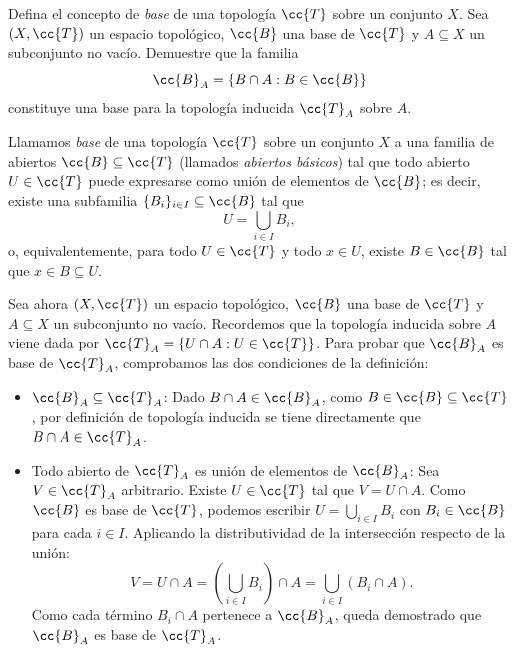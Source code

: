 \documentclass[12pt]{article}
\begin{document}
    \newpage
    \setcounter{ejercicio}{0} %
    \noindent
\begin{ejercicio}
Defina el concepto de \emph{base} de una topología $\cc{T}$ sobre un conjunto $X$.
Sea $(X, \cc{T})$ un espacio topológico, $\cc{B}$ una base de $\cc{T}$ y $A \subseteq X$ un subconjunto no vacío. Demuestre que la familia
\[
    \cc{B}_A = \{ B \cap A : B \in \cc{B} \}
\]
constituye una base para la topología inducida $\cc{T}_A$ sobre $A$.

\medskip
Llamamos \emph{base} de una topología $\cc{T}$ sobre un conjunto $X$ a una familia de abiertos $\cc{B} \subseteq \cc{T}$ (llamados \emph{abiertos básicos}) tal que todo abierto $U \in \cc{T}$ puede expresarse como unión de elementos de $\cc{B}$; es decir, existe una subfamilia $\{B_i\}_{i \in I} \subseteq \cc{B}$ tal que
\[
    U = \bigcup_{i \in I} B_i,
\]
o, equivalentemente, para todo $U \in \cc{T}$ y todo $x \in U$, existe $B \in \cc{B}$ tal que $x \in B \subseteq U$.

Sea ahora $(X, \cc{T})$ un espacio topológico, $\cc{B}$ una base de $\cc{T}$ y $A \subseteq X$ un subconjunto no vacío. Recordemos que la topología inducida sobre $A$ viene dada por $\cc{T}_A = \{ U \cap A : U \in \cc{T} \}$. Para probar que $\cc{B}_A$ es base de $\cc{T}_A$, comprobamos las dos condiciones de la definición:
\begin{itemize}
    \item $\cc{B}_A \subseteq \cc{T}_A$: Dado $B \cap A \in \cc{B}_A$, como $B \in \cc{B} \subseteq \cc{T}$, por definición de topología inducida se tiene directamente que $B \cap A \in \cc{T}_A$.
    \item Todo abierto de $\cc{T}_A$ es unión de elementos de $\cc{B}_A$: Sea $V \in \cc{T}_A$ arbitrario. Existe $U \in \cc{T}$ tal que $V = U \cap A$. Como $\cc{B}$ es base de $\cc{T}$, podemos escribir $\displaystyle U = \bigcup_{i \in I} B_i$ con $B_i \in \cc{B}$ para cada $i \in I$. Aplicando la distributividad de la intersección respecto de la unión:
    \[
        V = U \cap A = \left( \bigcup_{i \in I} B_i \right) \cap A = \bigcup_{i \in I} (B_i \cap A).
    \]
    Como cada término $B_i \cap A$ pertenece a $\cc{B}_A$, queda demostrado que $\cc{B}_A$ es base de $\cc{T}_A$.
\end{itemize}
\end{ejercicio}

\vspace{0.5cm}
\end{document}
